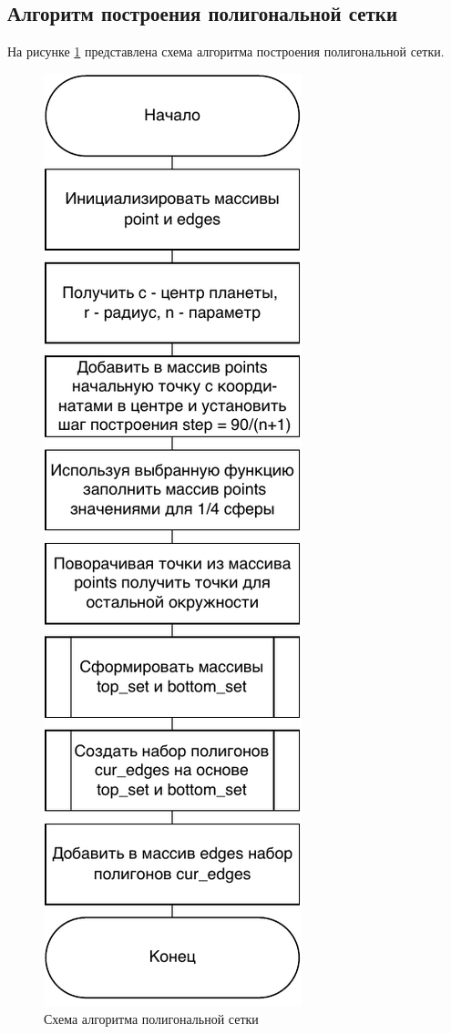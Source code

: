     \subsection{Алгоритм построения полигональной сетки}
    \par На рисунке \ref{schema:Pol_alg_1} представлена схема алгоритма построения полигональной сетки.
    \begin{figure}[h!]
            \centering
            \includegraphics[scale=0.8]{inc/Pol_al.pdf}
            \caption{Схема алгоритма полигональной сетки}
            \label{schema:Pol_alg_1}
    \end{figure}\clearpage
